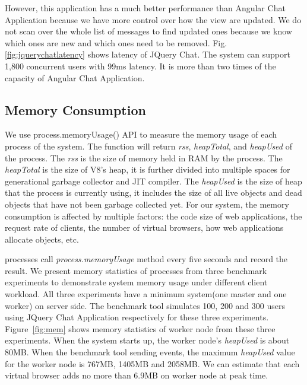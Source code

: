 However, this application has a much better performance than Angular 
Chat Application because we have more control over how the view
are updated.
We do not scan over the whole list of messages to find updated ones
because we know which ones are new and which ones need to be removed.
Fig.\ref{fig:jquerychatlatency} shows latency of JQuery Chat.
The system can support 1,800 concurrent users with 99ms latency.
It is more than two times of the capacity of Angular Chat Application.

\jquerychatlatency{}


\subsection{Memory Consumption}
We use \nodejs{} process.memoryUsage() API to measure the memory usage of each process
of the system.
The function will return \emph{rss}, \emph{heapTotal}, and \emph{heapUsed} of the process.
The \emph{rss} is the size of memory held in RAM by the process.
The \emph{heapTotal} is the size of V8's heap, it is further divided into 
multiple spaces for generational garbage collector and JIT compiler.
The \emph{heapUsed} is the size of heap that the process is currently using,
it includes the size of all live objects and dead objects that have not been garbage collected yet.
For our system, the memory consumption is affected by multiple factors:
the code size of web applications, the request rate of clients, 
the number of virtual browsers, how web applications allocate objects, etc.

\memfig{}

\cb{} processes call \emph{process.memoryUsage} method every five seconds and record
the result.
We present memory statistics of \cb{} processes from three benchmark experiments
 to demonstrate system memory usage under different client workload.
All three experiments have a minimum \cb{} system(one master and one worker) on server side.
The benchmark tool simulates 100, 200 and 300 users using JQuery Chat Application 
respectively for these three experiments.
Figure~\ref{fig:mem} shows memory statistics of worker node from these three experiments.
When the system starts up, the worker node's \emph{heapUsed} is about 80MB.
When the benchmark tool sending events,
the maximum \emph{heapUsed} value for the worker node is
767MB, 1405MB and 2058MB.
We can estimate that each virtual browser adds no more than 6.9MB on worker node 
at peak time.


